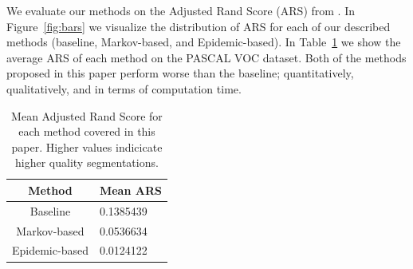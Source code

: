 \documentclass[twocolumn]{article}
\newcommand{\figref}[1]{Figure~\ref{fig:#1}}
\newcommand{\tblref}[1]{Table~\ref{tbl:#1}}
\newcommand{\tbllab}[1]{\label{tbl:#1}}
\begin{document}
We evaluate our methods on the Adjusted Rand Score (ARS) from
\cite{unnikrishnan2005measure}. In \figref{bars} we visualize the distribution
of ARS for each of our described methods (baseline, Markov-based, and
Epidemic-based). In \tblref{ars} we show the average ARS of each method on the
PASCAL VOC dataset. Both of the methods proposed in this paper perform worse
than the baseline; quantitatively, qualitatively, and in terms of computation
time.

\begin{table}
    \centering
    \caption{Mean Adjusted Rand Score for each method covered in this paper.
    Higher values indicicate higher quality segmentations.}
    \tbllab{ars}

    \begin{tabular}{c|l}
        Method & Mean ARS \\ \hline
        Baseline & 0.1385439 \\
        Markov-based & 0.0536634 \\
        Epidemic-based & 0.0124122
    \end{tabular}
\end{table}
\end{document}
